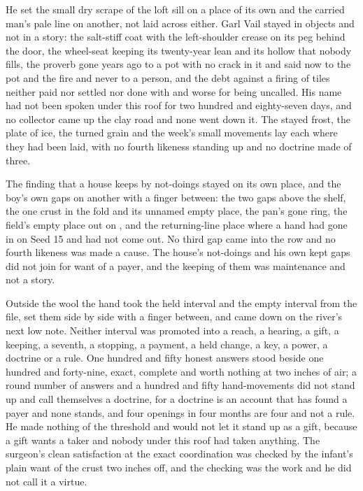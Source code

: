He set the small dry scrape of the loft sill on a place of its own and the carried man's pale line on another, not laid across either. Garl Vail stayed in objects and not in a story: the salt-stiff coat with the left-shoulder crease on its peg behind the door, the wheel-seat keeping its twenty-year lean and its hollow that nobody fills, the proverb gone years ago to a pot with no crack in it and said now to the pot and the fire and never to a person, and the debt against a firing of tiles neither paid nor settled nor done with and worse for being uncalled. His name had not been spoken under this roof for two hundred and eighty-seven days, and no collector came up the clay road and none went down it. The stayed frost, the plate of ice, the turned grain and the week's small movements lay each where they had been laid, with no fourth likeness standing up and no doctrine made of three.

The finding that a house keeps by not-doings stayed on its own place, and the boy's own gaps on another with a finger between: the two gaps above the shelf, the one crust in the fold and its unnamed empty place, the pan's gone ring, the field's empty place out on , and the returning-line place where a hand had gone in on Seed 15 and had not come out. No third gap came into the row and no fourth likeness was made a cause. The house's not-doings and his own kept gaps did not join for want of a payer, and the keeping of them was maintenance and not a story.

Outside the wool the hand took the held interval and the empty interval from the file, set them side by side with a finger between, and came down on the river's next low note. Neither interval was promoted into a reach, a hearing, a gift, a keeping, a seventh, a stopping, a payment, a held change, a key, a power, a doctrine or a rule. One hundred and fifty honest answers stood beside one hundred and forty-nine, exact, complete and worth nothing at two inches of air; a round number of answers and a hundred and fifty hand-movements did not stand up and call themselves a doctrine, for a doctrine is an account that has found a payer and none stands, and four openings in four months are four and not a rule. He made nothing of the threshold and would not let it stand up as a gift, because a gift wants a taker and nobody under this roof had taken anything. The surgeon's clean satisfaction at the exact coordination was checked by the infant's plain want of the crust two inches off, and the checking was the work and he did not call it a virtue.

